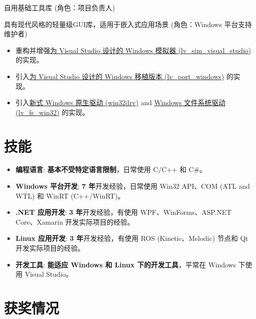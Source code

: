 \documentclass{resume}
\begin{document}
自用基础工具库 (角色：项目负责人)

具有现代风格的轻量级GUI库，适用于嵌入式应用场景 (角色：Windows 平台支持维护者)
\begin{itemize}
  \item 重构并增强\href{https://github.com/lvgl/lv_sim_visual_studio}{为 Visual Studio 设计的 Windows 模拟器 (lv\_sim\_visual\_studio)} 的实现。
  \item 引入\href{https://github.com/lvgl/lv_port_windows}{为 Visual Studio 设计的 Windows 移植版本 (lv\_port\_windows)} 的实现。
  \item 引入\href{https://github.com/lvgl/lv_drivers/pull/117}{新式 Windows 原生驱动 (win32drv)} and \href{https://github.com/lvgl/lvgl/pull/2701}{Windows 文件系统驱动 (lv\_fs\_win32)} 的实现。
\end{itemize}

\section{技能}
\begin{itemize}

  \item \textbf{编程语言}:
    \textbf{基本不受特定语言限制}，日常使用 C/C++ 和 C\#。

  \item \textbf{Windows 平台开发}:
    \textbf{7 年}开发经验，日常使用 Win32 API、COM (ATL and WTL) 和 WinRT (C++/WinRT)。

  \item \textbf{.NET 应用开发}:
    \textbf{3 年}开发经验，有使用 WPF、WinForms、ASP.NET Core、Xamarin 开发实际项目的经验。
  
  \item \textbf{Linux 应用开发}:
    \textbf{3 年}开发经验，有使用 ROS (Kinetic、Melodic) 节点和 Qt 开发实际项目的经验。

  \item \textbf{开发工具}:
    \textbf{能适应 Windows 和 Linux 下的开发工具}，平常在 Windows 下使用 Visual Studio。

\end{itemize}

\section{获奖情况}

\end{document}
